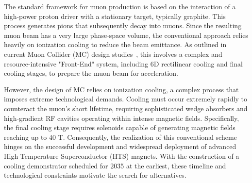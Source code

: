 \documentclass[a4paper,11pt]{article}
\begin{document}











The standard framework for muon production is based on the interaction of a high-power proton driver with a stationary target, typically graphite. This process generates pions that subsequently decay into muons. Since the resulting muon beam has a very large phase-space volume, the conventional approach relies heavily on ionization cooling to reduce the beam emittance. As outlined in current Muon Collider (MC) design studies~\cite{Delahaye:2019omf}, this involves a complex and resource-intensive "Front-End" system, including 6D rectilinear cooling and final cooling stages, to prepare the muon beam for acceleration.

However, the design of MC relies on ionization cooling, a complex process that imposes extreme technological demands. Cooling must occur extremely rapidly to counteract the muon’s short lifetime, requiring sophisticated wedge absorbers and high-gradient RF cavities operating within intense magnetic fields. Specifically, the final cooling stage requires solenoids capable of generating magnetic fields reaching up to 40 T. Consequently, the realization of this conventional scheme hinges on the successful development and widespread deployment of advanced High Temperature Superconductor (HTS) magnets. With the construction of a cooling demonstrator scheduled for 2035 at the earliest, these timeline and technological constraints motivate the search for alternatives.
\end{document}

